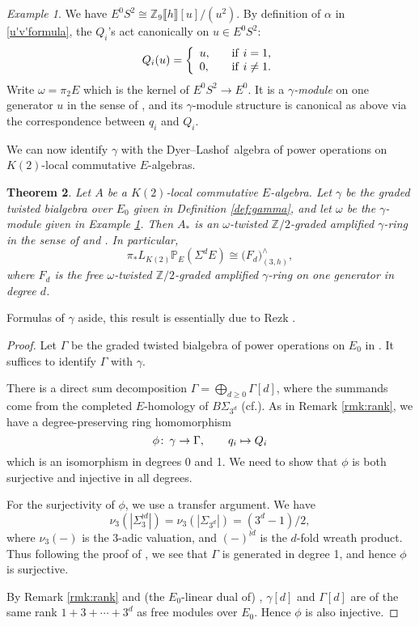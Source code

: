 \documentclass{gtpart}
\newtheorem{thm}{Theorem}
\theoremstyle{definition}
\theoremstyle{remark}
\newtheorem{exam}[thm]{Example}
\def\co{\colon\thinspace}
\newcommand{\mb}[1]{\mathbb{#1}}
\newcommand{\cf}{cf.\thinspace}
\newcommand{\DL}{Dyer--Lashof~}
\newcommand{\BP}{{\mb P}}
\newcommand{\BZ}{{\mb Z}}
\newcommand{\A}{\alpha}
\newcommand{\G}{\Gamma}
\newcommand{\g}{\gamma}
\begin{document}
\begin{exam}
\label{ex:omega}
 We have $E^0 S^2 \cong \BZ_9 \llbracket h \rrbracket [u] / (u^2)$.  
 By definition of $\A$ in \eqref{u'v'formula}, the $Q_i$'s act canonically on $u \in E^0 S^2$: 
 \[
  Q_i(u) = \left\{
  \begin{array}{ll}
    u,  & \quad {\rm if}~i = 1, \\
    0,  & \quad {\rm if}~i \neq 1.  \\
  \end{array}
  \right.
 \]
 Write $\omega = \pi_2 E$ which is the kernel of $E^0 S^2 \to E^0$.  
 It is a {\em $\g$-module} on one generator $u$ in the sense of \cite[2.2]{h2p2}, 
 and its $\g$-module structure is canonical as above via the correspondence between $q_i$ and $Q_i$.  
\end{exam}

We can now identify $\g$ with the \DL algebra of power operations on $K(2)$-local commutative $E$-algebras.  

\begin{thm}
\label{thm:gamma}
 Let $A$ be a $K(2)$-local commutative $E$-algebra.  
 Let $\g$ be the graded twisted bialgebra over $E_0$ given in Definition \ref{def:gamma}, and let $\omega$ be the $\g$-module given in Example \ref{ex:omega}.  
 Then $A_*$ is an {\em $\omega$-twisted $\BZ/2$-graded amplified $\g$-ring} in the sense of \cite[Section 2]{cong} and \cite[2.5 and 2.6]{h2p2}.  In particular, 
 \[
  \pi_* L_{K(2)} \BP_E (\Sigma^d E) \cong \big( F_d \big)_{(3,h)}^\wedge, 
 \]
 where $F_d$ is the free $\omega$-twisted $\BZ/2$-graded amplified $\g$-ring on one generator in degree $d$.  
\end{thm}
Formulas of $\g$ aside, this result is essentially due to Rezk \cite{cong, h2p2}.  
\begin{proof}
 Let $\G$ be the graded twisted bialgebra of power operations on $E_0$ in \cite[Section 6]{cong}.  
 It suffices to identify $\G$ with $\g$.  

 There is a direct sum decomposition $\G = \bigoplus_{d \geq 0} \G[d]$, 
 where the summands come from the completed $E$-homology of $B\Sigma_{3^d}$ (\cf \cite[6.2]{cong}).  
 As in Remark \ref{rmk:rank}, we have a degree-preserving ring homomorphism 
 \[
  \phi \co \g \to \G, \qquad q_i \mapsto Q_i
 \]
 which is an isomorphism in degrees 0 and 1.  
 We need to show that $\phi$ is both surjective and injective in all degrees.  

 For the surjectivity of $\phi$, we use a transfer argument.  
 We have 
 \[
  \nu_3(|\Sigma_3^{\wr d}|) = \nu_3(|\Sigma_{3^d}|) = (3^d - 1) / 2, 
 \]
 where $\nu_3(-)$ is the 3-adic valuation, and $(-)^{\wr d}$ is the $d$-fold wreath product.  
 Thus following the proof of \cite[Proposition 3.17]{cong}, 
 we see that $\G$ is generated in degree 1, and hence $\phi$ is surjective.  

 By Remark \ref{rmk:rank} and (the $E_0$-linear dual of) \cite[Theorem 1.1]{Str98}, 
 $\g[d]$ and $\G[d]$ are of the same rank $1 + 3 + \cdots + 3^d$ as free modules over $E_0$.  
 Hence $\phi$ is also injective.  
\end{proof}
\end{document}
